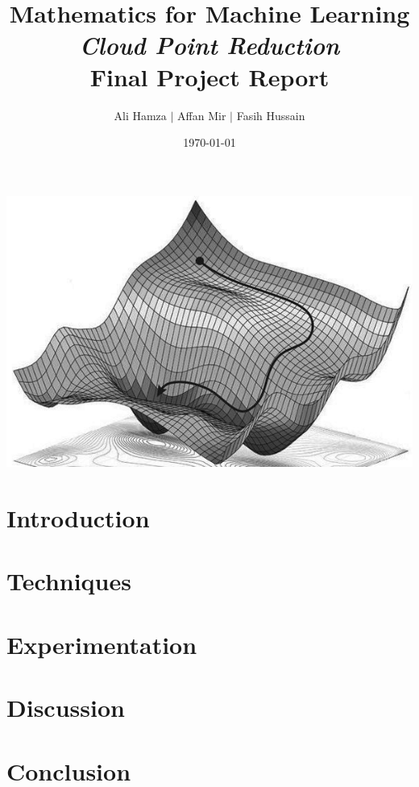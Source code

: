 \documentclass[a4paper, 11pt]{article}
\title{Mathematics for Machine Learning \\ \LARGE { \textit{Cloud Point Reduction}\\Final Project Report }}
\author{Ali Hamza $|$ Affan Mir $|$ Fasih Hussain}
\date{\today}
\begin{document}
\maketitle
\begin{center}
    \includegraphics[scale=0.5]{Report/images/title2.jpg}
\end{center}
\newpage

\section{Introduction}
\section{Techniques}
\section{Experimentation}
\section{Discussion}
\section{Conclusion}
\end{document}
